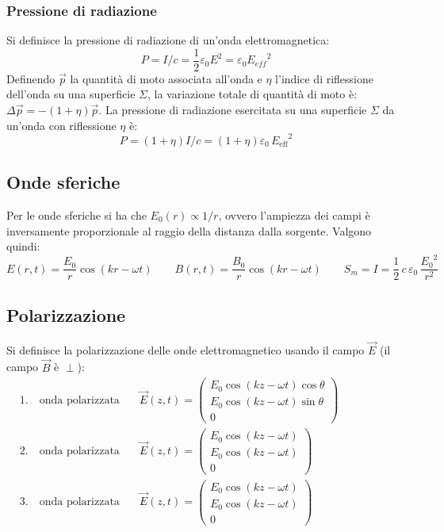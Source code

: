 \documentclass[a4paper]{article}
\begin{document}
\subsubsection*{Pressione di radiazione}
Si definisce la pressione di radiazione di un'onda elettromagnetica:
\[P = I/c = \frac{1}{2} \varepsilon_0 E^2 = \varepsilon_0 {E_{eff}}^2\]
Definendo \(\vec{p}\) la quantità di moto associata all'onda e \(\eta\) l'indice di riflessione dell'onda su una superficie
\(\Sigma\), la variazione totale di quantità di moto è: \(\Delta \vec{p} = -(1+\eta) \vec{p}\). La pressione di radiazione
esercitata su una superficie \(\Sigma\) da un'onda con riflessione \(\eta\) è:
\[P = (1 + \eta)I/c = (1+\eta) \varepsilon_0 \, {E_\text{eff}}^2\]

\subsection{Onde sferiche}
Per le onde sferiche si ha che \(E_0(r) \propto 1/r\), ovvero l'ampiezza dei campi è inversamente proporzionale al raggio della
distanza dalla sorgente. Valgono quindi:
\[E(r,t) = \frac{E_0}{r} \cos (kr -\omega t) \qquad B(r,t) = \frac{B_0}{r} \cos (kr -\omega t) \qquad S_m = I = \frac{1}{2} \, c \, \varepsilon_0 \, \frac{{E_0}^2}{r^2} \]

\subsection{Polarizzazione}
Si definisce la polarizzazione delle onde elettromagnetico usando il campo \(\vec{E}\) (il campo \(\vec{B}\) è \(\perp\)):
\begin{align*}
	&1. \quad \text{onda polarizzata linearmente}: &&\vec{E}(z,t) = \left(\begin{matrix} E_0 \cos (kz - \omega t) \cos \theta \\ E_0 \cos (kz - \omega t) \sin \theta \\ 0 \end{matrix}\right) \\
	&2. \quad \text{onda polarizzata circolarmente}: &&\vec{E}(z,t) = \left(\begin{matrix} E_0 \cos (kz - \omega t) \\ E_0 \cos (kz - \omega t) \\ 0 \end{matrix}\right) \\
	&3. \quad \text{onda polarizzata ellitticamente}: &&\vec{E}(z,t) = \left(\begin{matrix} E_0 \cos (kz - \omega t) \\ E_0 \cos (kz - \omega t) \\ 0 \end{matrix}\right) \qquad\qquad\qquad\qquad
\end{align*}
\end{document}

